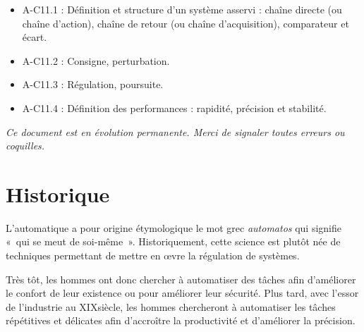 \documentclass[11pt,oneside]{article}
\begin{document}
\begin{savoir}
\begin{itemize}
\item A-C11.1 : Définition et structure d'un système asservi : chaîne directe (ou chaîne d'action), chaîne de retour (ou chaîne d'acquisition), comparateur et écart.
\item A-C11.2 : Consigne, perturbation.
\item A-C11.3 : Régulation, poursuite.
\item A-C11.4 : Définition des performances : rapidité, précision et stabilité.
\end{itemize}
\end{savoir}

%


\setlength{\parskip}{0ex plus 0.2ex minus 0ex}
 \renewcommand{\contentsname}{}
 \renewcommand{\baselinestretch}{1}

\textit{Ce document est en évolution permanente. Merci de signaler toutes
erreurs ou coquilles.}

\tableofcontents

 \renewcommand{\baselinestretch}{1.2}
\setlength{\parskip}{2ex plus 0.5ex minus 0.2ex}

\section{Historique}
L'automatique a pour origine étymologique le mot grec \textit{automatos} qui
signifie «~qui se meut de soi-même~». Historiquement, cette science est
plutôt née de techniques permettant de mettre en \oe{}vre la régulation de
systèmes.

Très tôt, les hommes ont donc chercher à automatiser des tâches afin
d'améliorer le confort de leur existence ou pour améliorer leur sécurité. Plus
tard, avec l'essor de l'industrie au XIX\ieme siècle, les hommes chercheront à
automatiser les tâches répétitives et délicates afin d'accroître la
productivité et d'améliorer la précision.
\end{document}
